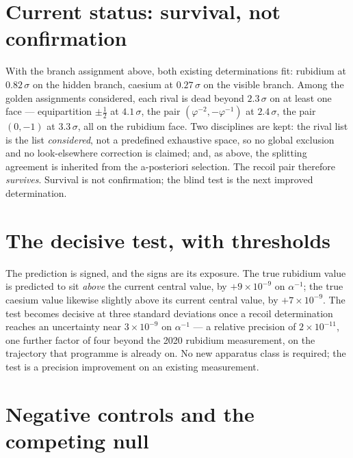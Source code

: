 \documentclass[11pt]{article}
\newcommand{\vp}{\varphi}
\newcommand{\ainv}{\alpha^{-1}}
\begin{document}
\section{Current status: survival, not confirmation}

With the branch assignment above, both existing determinations fit: rubidium at
$0.82\,\sigma$ on the hidden branch, caesium at $0.27\,\sigma$ on the visible
branch. Among the golden assignments considered, each rival is dead beyond
$2.3\,\sigma$ on at least one face --- equipartition $\pm\tfrac12$ at
$4.1\,\sigma$, the pair $(\vp^{-2},-\vp^{-1})$ at $2.4\,\sigma$, the pair
$(0,-1)$ at $3.3\,\sigma$, all on the rubidium face. Two disciplines are kept:
the rival list is the list \emph{considered}, not a predefined exhaustive space,
so no global exclusion and no look-elsewhere correction is claimed; and, as
above, the splitting agreement is inherited from the a-posteriori selection. The
recoil pair therefore \emph{survives}. Survival is not confirmation; the blind
test is the next improved determination.

\section{The decisive test, with thresholds}

The prediction is signed, and the signs are its exposure. The true rubidium value
is predicted to sit \emph{above} the current central value, by
$+9\times10^{-9}$ on $\ainv$; the true caesium value likewise slightly above its
current central value, by $+7\times10^{-9}$. The test becomes decisive at three
standard deviations once a recoil determination reaches an uncertainty near
$3\times10^{-9}$ on $\ainv$ --- a relative precision of $2\times10^{-11}$, one
further factor of four beyond the 2020 rubidium measurement, on the trajectory
that programme is already on. No new apparatus class is required; the test is a
precision improvement on an existing measurement.

\section{Negative controls and the competing null}
\end{document}
